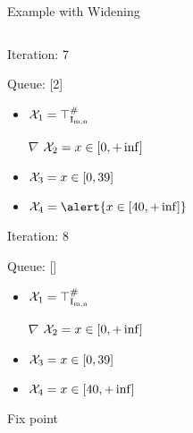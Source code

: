 \documentclass{beamer}
\newcommand{\Intmn}{\textrm{I}_{\textrm{m,n}}}
\begin{document}
\begin{frame}{Example with Widening}
\begin{columns}[T]
\begin{column}{0.4\textwidth}
\begin{overprint}
                Iteration: 7

                Queue: [2]

                \begin{itemize}
                    \item ${\cal{X}}_1 = \top^\#_{\Intmn}$
                    \item[$\nabla$] ${\cal{X}}_2 = x \in [0, +\inf]$
                    \item ${\cal{X}}_3 = x \in [0, 39]$
                    \item ${\cal{X}}_4 = \alert{x \in [40, +\inf]}$
                \end{itemize}


                Iteration: 8

                Queue: []

                \begin{itemize}
                    \item ${\cal{X}}_1 = \top^\#_{\Intmn}$
                    \item[$\nabla$] ${\cal{X}}_2 = x \in [0, +\inf]$
                    \item ${\cal{X}}_3 = x \in [0, 39]$
                    \item ${\cal{X}}_4 = x \in [40, +\inf]$
                \end{itemize}
                Fix point


            \end{overprint}

        \end{column}
    \end{columns}

\end{frame}
\end{document}
